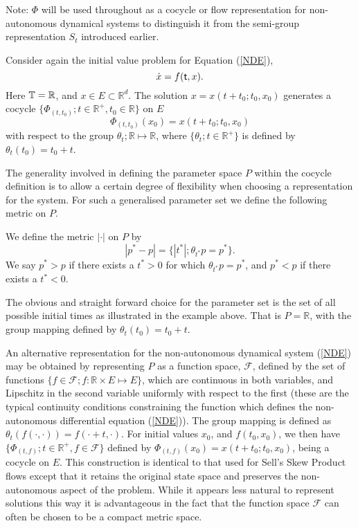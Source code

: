 Note: $\Phi$ will be used throughout as a cocycle or flow representation
for non-autonomous dynamical systems to distinguish it from the semi-group
representation $S_t$ introduced earlier.

\begin{eg}
  Consider again the initial value problem for Equation (\ref{NDE}),
  \[ \dot{x} = f( \mathsf{\mathsf{t}},x). \]
  Here $\mathbb{T} = \mathbb{R}$, and $x \in E \subset \mathbb{R}^d$.
  The solution $x = x(t+t_0;t_0,x_0)$ generates a cocycle
  $\{ \Phi_{(t,t_0)}; t \in \mathbb{R}^+, t_0 \in \mathbb{R} \}$ on $E$
  \[ \Phi_{(t,t_0)}(x_0)=x(t+t_0;t_0,x_0) \]
  with respect to the group $\theta_t; \mathbb{R} \mapsto
  \mathbb{R}$, where $\{\theta_t;t\in \mathbb{R}^+\}$ is defined by
  $\theta_t (t_0) = t_0 +t$.
\end{eg}

The generality involved in defining the parameter space $P$ within the
cocycle definition is to allow a certain degree of flexibility when
choosing a representation for the system. For such a generalised parameter set
we define the following metric on $P$.

\begin{defn}[Metric on $P$]
  We define the metric $|\cdot|$ on $P$ by
  \[ |p^* - p| = \{ |t^*| ; \theta_{t^*}p = p^* \}. \]
  We say $p^* > p$ if  there exists a $t^* > 0$ for which $\theta_{t^*}p = p^*$,
and $p^* < p$ if there exists a $t^* <   0$.
\end{defn}

The obvious and straight forward choice for the parameter set is
the set of all possible initial times as illustrated in the example above. That
is $P=\mathbb{R}$, with the group mapping defined by $\theta_t(t_0) = t_0 + t$.

An alternative representation for the non-autonomous dynamical system
(\ref{NDE}) may be obtained by representing $P$ as a function space,
$\mathcal{F}$, defined by the set of functions $\{f \in \mathcal{F}; f:
\mathbb{R} \times E \mapsto E \}$, which are continuous in both variables,
and Lipschitz in the second variable uniformly with respect to the first
(these are the typical continuity conditions constraining the function
which defines the non-autonomous differential equation (\ref{NDE})). The
group mapping is defined as $\theta_t(f(\cdot,\cdot)) =
f(\cdot+t,\cdot)$. For initial values $x_0$, and
$f(t_0,x_0)$,  we then have $\{\Phi_{(t,f)};t \in
\mathbb{R}^+, f \in \mathcal{F}\}$ defined by $\Phi_{(t,f)}(x_0) =
x(t+t_0;t_0, x_0)$, being a cocycle on $E$. This construction is identical to that used 
for Sell's Skew Product flows except that it retains the original state space and
preserves the non-autonomous aspect of the problem. While it appears less
natural to represent solutions this way it is advantageous in the fact that the function
space $\mathcal{F}$ can often be chosen to be a compact metric space.

